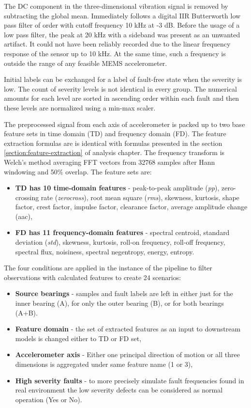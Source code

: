 The DC component in the three-dimensional vibration signal is removed by subtracting the global mean. Immediately follows a digital IIR Butterworth low pass filter of  order with cutoff frequency 10 kHz at -3 dB. Before the usage of a low pass filter, the peak at 20 kHz with a sideband was present as an unwanted artifact. It could not have been reliably recorded due to the linear frequency response of the sensor up to 10 kHz. At the same time, such a frequency is outside the range of any feasible MEMS accelerometer.

Initial labels can be exchanged for a label of fault-free state when the severity is low. The count of severity levels is not identical in every group. The numerical amounts for each level are sorted in ascending order within each fault and then these levels are normalized using a min-max scaler.

The preprocessed signal from each axis of accelerometer is packed up to two base feature sets in time domain (TD) and frequency domain (FD). The feature extraction formulas are is identical with formulas presented in the section \ref{section:feature-extraction} of analysis chapter. The frequency transform is Welch's method averaging FFT vectors from 32768 samples after Hann windowing and 50\% overlap. The feature sets are:
\begin{itemize}
\itemsep0pt
\item \textbf{TD has 10 time-domain features} - peak-to-peak amplitude (\emph{pp}), zero-crossing rate (\emph{zerocross}), root mean square (\emph{rms}), skewness, kurtosis, shape factor, crest factor, impulse factor, clearance factor, average amplitude change (aac), 
\item \textbf{FD has 11 frequency-domain features} - spectral centroid, standard deviation (\emph{std}), skewness, kurtosis, roll-on frequency, roll-off frequency, spectral flux, noisiness, spectral negentropy, energy, entropy.
\end{itemize}
 
The four conditions are applied in the instance of the pipeline to filter observations with calculated features to create 24 scenarios:
\begin{itemize}
\itemsep0pt
\item \textbf{Source bearings} - samples and fault labels are left in either just for the inner bearing (A), for only the outer bearing (B), or for both bearings (A+B).
\item \textbf{Feature domain} - the set of extracted features as an input to downstream models is changed either to TD or FD set,
\item \textbf{Accelerometer axis} - Either one principal direction of motion or all three dimensions is aggregated under same feature name (1 or 3),
\item \textbf{High severity faults} - to more precisely simulate fault frequencies found in real environment the low severity defects can be considered as normal operation (Yes or No).
\end{itemize}


